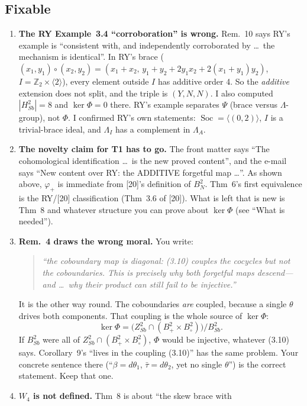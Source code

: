 \documentclass[11pt]{article}
\newcommand{\Z}{\mathbb{Z}}
\newcommand{\Soc}{\operatorname{Soc}}
\newenvironment{quoted}{\begin{quote}\small\itshape}{\end{quote}}
\begin{document}
\subsection*{Fixable}
\begin{enumerate}[leftmargin=*,resume]
\item \textbf{The RY Example~3.4 ``corroboration'' is wrong.} Rem.~10 says RY's example is
  ``consistent with, and independently corroborated by \ldots\ the mechanism is identical''.
  In RY's brace ($(x_1,y_1)\circ(x_2,y_2)=(x_1+x_2,\,y_1+y_2+2y_1x_2+2(x_1+y_1)y_2)$,
  $I=\Z_2\times\langle2\rangle$), every element outside $I$ has additive order 4. So the
  \emph{additive} extension does not split, and the triple is $(Y,N,N)$. I also computed
  $|H^2_{Sb}|=8$ and $\ker\Phi=0$ there. RY's example separates $\Psi$ (brace versus
  $\Lambda$-group), not $\Phi$. I confirmed RY's own statements: $\Soc=\langle(0,2)\rangle$,
  $I$ is a trivial-brace ideal, and $\Lambda_I$ has a complement in $\Lambda_A$.
\item \textbf{The novelty claim for T1 has to go.} The front matter says ``The
  cohomological identification \ldots\ is the new proved content'', and the e-mail says ``New
  content over RY: the ADDITIVE forgetful map \ldots''. As shown above, $\varphi_+$ is
  immediate from [20]'s definition of $B^2_N$. Thm~6's first equivalence is the RY/[20]
  classification (Thm~3.6 of [20]). What is left that is new is Thm~8 and whatever
  structure you can prove about $\ker\Phi$ (see ``What is needed'').
\item \textbf{Rem.~4 draws the wrong moral.} You write:
  \begin{quoted}``the coboundary map is \emph{diagonal}: (3.10) couples the cocycles but not the coboundaries. This is precisely why both forgetful maps descend---and \ldots\ why their product can still fail to be injective.''\end{quoted}
  It is the other way round. The coboundaries \emph{are} coupled, because a single $\theta$
  drives both components. That coupling is the whole source of $\ker\Phi$:
  \[
  \ker\Phi=\bigl(Z^2_{Sb}\cap(B^2_+\times B^2_\circ)\bigr)/B^2_{Sb}.
  \]
  If $B^2_{Sb}$ were all of $Z^2_{Sb}\cap(B^2_+\times B^2_\circ)$, $\Phi$ would be injective,
  whatever (3.10) says. Corollary~9's ``lives in the coupling (3.10)'' has the same problem.
  Your concrete sentence there (``$\beta=d\theta_1$, $\bar\tau=d\theta_2$, yet no single
  $\theta$'') is the correct statement. Keep that one.
\item \textbf{$W_4$ is not defined.} Thm~8 is about ``the skew brace with

\end{enumerate}
\end{document}
